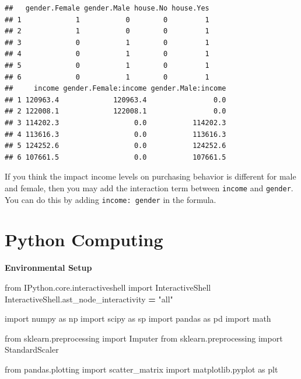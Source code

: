 \documentclass[12pt,]{krantz}
\newenvironment{Shaded}{\begin{snugshade}}{\end{snugshade}}
\newcommand{\StringTok}[1]{\textcolor[rgb]{0.31,0.60,0.02}{{#1}}}
\newcommand{\ImportTok}[1]{{#1}}
\newcommand{\OperatorTok}[1]{\textcolor[rgb]{0.81,0.36,0.00}{\textbf{{#1}}}}
\newcommand{\NormalTok}[1]{{#1}}
\theoremstyle{definition}
\theoremstyle{definition}
\theoremstyle{remark}
\begin{document}
\begin{verbatim}
##   gender.Female gender.Male house.No house.Yes
## 1             1           0        0         1
## 2             1           0        0         1
## 3             0           1        0         1
## 4             0           1        0         1
## 5             0           1        0         1
## 6             0           1        0         1
##     income gender.Female:income gender.Male:income
## 1 120963.4             120963.4                0.0
## 2 122008.1             122008.1                0.0
## 3 114202.3                  0.0           114202.3
## 4 113616.3                  0.0           113616.3
## 5 124252.6                  0.0           124252.6
## 6 107661.5                  0.0           107661.5
\end{verbatim}

If you think the impact income levels on purchasing behavior is
different for male and female, then you may add the interaction term
between \texttt{income} and \texttt{gender}. You can do this by adding
\texttt{income:\ gender} in the formula.

\section{Python Computing}\label{python-computing}

\textbf{Environmental Setup}

\begin{Shaded}
\begin{Highlighting}[]
\ImportTok{from} \NormalTok{IPython.core.interactiveshell }\ImportTok{import} \NormalTok{InteractiveShell}
\NormalTok{InteractiveShell.ast_node_interactivity }\OperatorTok{=} \StringTok{"all"}

\ImportTok{import} \NormalTok{numpy }\ImportTok{as} \NormalTok{np}
\ImportTok{import} \NormalTok{scipy }\ImportTok{as} \NormalTok{sp}
\ImportTok{import} \NormalTok{pandas }\ImportTok{as} \NormalTok{pd}
\ImportTok{import} \NormalTok{math}

\ImportTok{from} \NormalTok{sklearn.preprocessing }\ImportTok{import} \NormalTok{Imputer}
\ImportTok{from} \NormalTok{sklearn.preprocessing }\ImportTok{import} \NormalTok{StandardScaler}

\ImportTok{from} \NormalTok{pandas.plotting }\ImportTok{import} \NormalTok{scatter_matrix}
\ImportTok{import} \NormalTok{matplotlib.pyplot }\ImportTok{as} \NormalTok{plt}
\end{Highlighting}
\end{Shaded}
\end{document}

